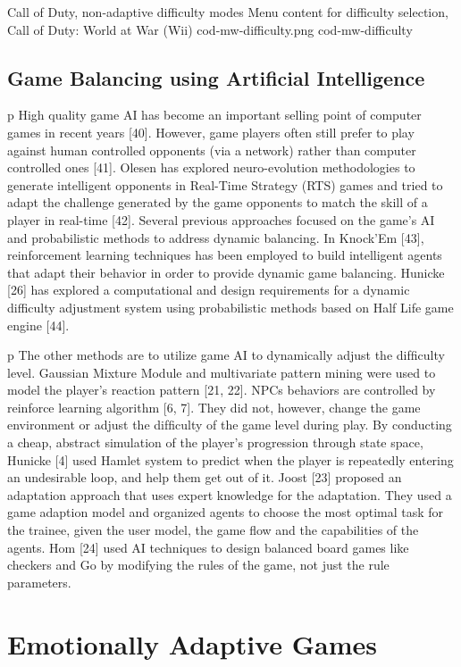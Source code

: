 \img
{Call of Duty, non-adaptive difficulty modes}
{Menu content for difficulty selection, Call of Duty: World at War (Wii)}
{cod-mw-difficulty.png}
{cod-mw-difficulty}

\subsection{Game Balancing using Artificial Intelligence}
p High quality game AI has become an important selling point of computer games in recent years [40]. However, game players often still prefer to play against human controlled opponents (via a network) rather than computer controlled ones [41]. Olesen has explored neuro-evolution methodologies to generate intelligent opponents in Real-Time Strategy (RTS) games and tried to adapt the challenge generated by the game opponents to match the skill of a player in real-time [42]. Several previous approaches focused on the game’s AI and probabilistic methods to address dynamic balancing. In Knock’Em [43], reinforcement learning techniques has been employed to build intelligent agents that adapt their behavior in order to provide dynamic game balancing. Hunicke [26] has explored a computational and design requirements for a dynamic difficulty adjustment system using probabilistic methods based on Half Life game engine [44]. 

p The other methods are to utilize game AI to dynamically adjust the difﬁculty level. Gaussian Mixture Module and multivariate pattern mining were used to model the player’s reaction pattern [21, 22]. NPCs behaviors are controlled by reinforce learning algorithm [6, 7]. They did not, however, change the game environment or adjust the difﬁculty of the game level during play. By conducting a cheap, abstract simulation of the player’s progression through state space, Hunicke [4] used Hamlet system to predict when the player is repeatedly entering an undesirable loop, and help them get out of it. Joost [23] proposed an adaptation approach that uses expert knowledge for the adaptation. They used a game adaption model and organized agents to choose the most optimal task for the trainee, given the user model, the game ﬂow and the capabilities of the agents. Hom [24] used AI techniques to design balanced board games like checkers and Go by modifying the rules of the game, not just the rule parameters.

\section{Emotionally Adaptive Games}

